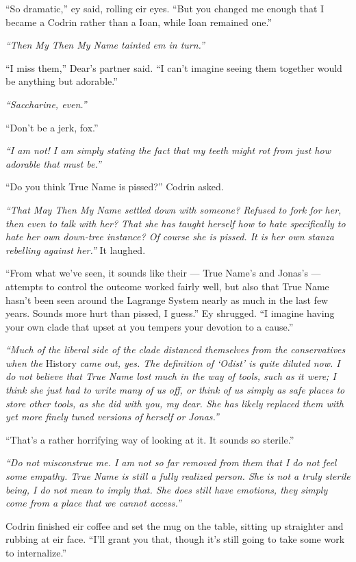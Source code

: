 ``So dramatic,'' ey said, rolling eir eyes. ``But you changed me enough that I became a Codrin rather than a Ioan, while Ioan remained one.''

\emph{``Then My Then My Name tainted em in turn.''}

``I miss them,'' Dear's partner said. ``I can't imagine seeing them together would be anything but adorable.''

\emph{``Saccharine, even.''}

``Don't be a jerk, fox.''

\emph{``I am not! I am simply stating the fact that my teeth might rot from just how adorable that must be.''}

``Do you think True Name is pissed?'' Codrin asked.

\emph{``That May Then My Name settled down with someone? Refused to fork for her, then even to talk with her? That she has taught herself how to hate specifically to hate her own down-tree instance? Of course she is pissed. It is her own stanza rebelling against her.''} It laughed.

``From what we've seen, it sounds like their — True Name's and Jonas's — attempts to control the outcome worked fairly well, but also that True Name hasn't been seen around the Lagrange System nearly as much in the last few years. Sounds more hurt than pissed, I guess.'' Ey shrugged. ``I imagine having your own clade that upset at you tempers your devotion to a cause.''

\emph{``Much of the liberal side of the clade distanced themselves from the conservatives when the} History \emph{came out, yes. The definition of `Odist' is quite diluted now. I do not believe that True Name lost much in the way of tools, such as it were; I think she just had to write many of us off, or think of us simply as safe places to store other tools, as she did with you, my dear. She has likely replaced them with yet more finely tuned versions of herself or Jonas.''}

``That's a rather horrifying way of looking at it. It sounds so sterile.''

\emph{``Do not misconstrue me. I am not so far removed from them that I do not feel some empathy. True Name is still a fully realized person. She is not a truly sterile being, I do not mean to imply that. She does still have emotions, they simply come from a place that we cannot access.''}

Codrin finished eir coffee and set the mug on the table, sitting up straighter and rubbing at eir face. ``I'll grant you that, though it's still going to take some work to internalize.''

